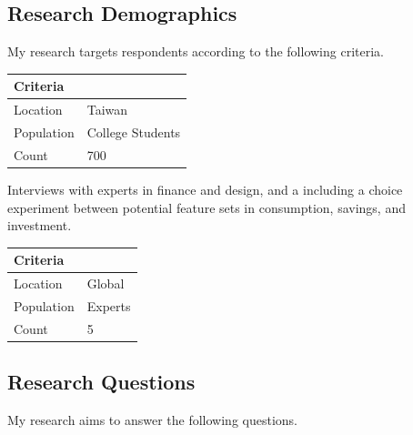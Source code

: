 \documentclass[
  letterpaper,
  DIV=11,
  numbers=noendperiod]{scrartcl}
\begin{document}
\subsection{Research Demographics}\label{research-demographics}

My research targets respondents according to the following criteria.

\begin{longtable}[]{@{}ll@{}}
\toprule\noalign{}
Criteria & \\
\midrule\noalign{}
\endhead
\bottomrule\noalign{}
\endlastfoot
Location & Taiwan \\
Population & College Students \\
Count & 700 \\
\end{longtable}

Interviews with experts in finance and design, and a including a choice
experiment between potential feature sets in consumption, savings, and
investment.

\begin{longtable}[]{@{}ll@{}}
\toprule\noalign{}
Criteria & \\
\midrule\noalign{}
\endhead
\bottomrule\noalign{}
\endlastfoot
Location & Global \\
Population & Experts \\
Count & 5 \\
\end{longtable}

\subsection{Research Questions}\label{research-questions}

My research aims to answer the following questions.
\end{document}
